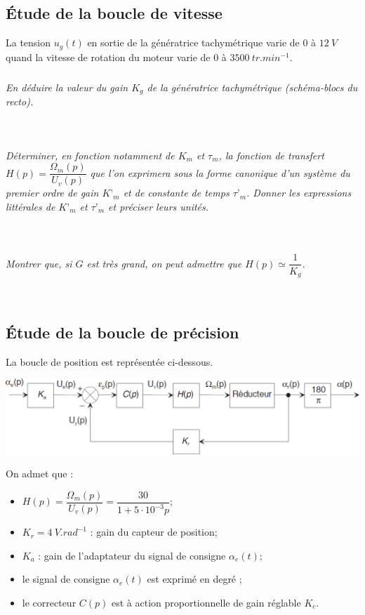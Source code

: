 \documentclass[10pt,fleqn]{article} %
\begin{document}
\begin{multicols}{2}
\subsection*{Étude de la boucle de vitesse}
La tension $u_g(t)$ en sortie de la génératrice tachymétrique varie de 0 à $\SI{12}{V}$ quand la vitesse de 
rotation du moteur varie de 0 à $\SI{3500}{tr.min^{-1}}$.


\subparagraph{}\textit{En déduire la valeur du gain $K_g$ de la génératrice tachymétrique (schéma-blocs du recto).}
\ifprof
\begin{corrige}~\\
\end{corrige}
\else
\fi

\subparagraph{}\textit{Déterminer, en fonction notamment de $K_m$ et $\tau_m$, la fonction de transfert 
$H(p)=\dfrac{\Omega_m(p)}{U_v(p)}$  que l’on exprimera sous la forme canonique d’un système du premier ordre
de gain $K’_m$ et de constante de temps $\tau’_m$. Donner les expressions littérales de $K’_m$ et $\tau’_m$ et
préciser leurs unités. }
\ifprof
\begin{corrige}~\\
\end{corrige}
\else
\fi

\subparagraph{}\textit{Montrer que, si $G$ est très grand, on peut admettre que $H(p)\simeq \dfrac{1}{K_g}$.}
\ifprof
\begin{corrige}~\\
\end{corrige}
\else
\fi
 
\subsection*{Étude de la boucle de précision}
 La boucle de position est représentée ci-dessous. 
 
 \begin{center}
\includegraphics[width=\linewidth]{images/fig_03}
\end{center}

 
 On admet que : 
 \begin{itemize}
 \item $H(p)=\dfrac{\Omega_m(p)}{U_v(p)}=\dfrac{30}{1+5\cdot 10^{-3}p}$;
 \item $K_r=\SI{4}{V.rad^{-1}}$ : gain du capteur de position;
 \item $K_a$ : gain de l’adaptateur du signal de consigne $\alpha_e(t)$; 
 \item le signal de consigne  $\alpha_e(t)$  est exprimé en degré ; 
 \item le correcteur $C(p)$ est à action proportionnelle de gain réglable $K_c$.
 \end{itemize} 
 

\end{multicols}
\end{document}
